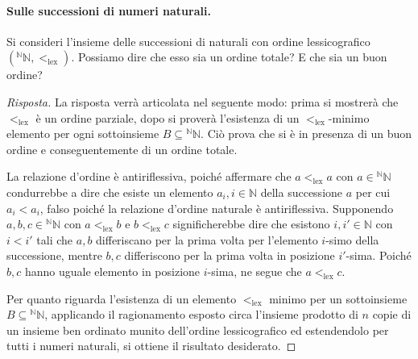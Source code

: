 \documentclass[fontsize = 11 pt, paper=A4, oneside, index=totoc, hyperref]{book}
\theoremstyle{definition}
\theoremstyle{plain}
\newcommand{\N}{\mathbb{N}}
\begin{document}
\paragraph{Sulle successioni di numeri naturali.} Si consideri l'insieme delle successioni di naturali con ordine lessicografico \(({}^\N\N, <_{\mathrm{lex}})\). Possiamo dire che esso sia un ordine totale? E che sia un buon ordine?
\begin{proof}[Risposta]
  La risposta verrà articolata nel seguente modo: prima si mostrerà che \(<_{\mathrm{lex}}\) è un ordine parziale, dopo si proverà l'esistenza di un \(<_{\mathrm{lex}}\)-minimo elemento per ogni sottoinsieme \(B \subseteq {}^\N\N\). Ciò prova che si è in presenza di un buon ordine e conseguentemente di un ordine totale.

  La relazione d'ordine è antiriflessiva, poiché affermare che \(a <_{\mathrm{lex}} a\) con \(a \in {}^\N\N\) condurrebbe a dire che esiste un elemento \(a_i, i \in \N\) della successione \(a\) per cui \(a_i < a_i\), falso poiché la relazione d'ordine naturale è antiriflessiva. Supponendo \(a,b,c \in {}^\N\N\) con \(a <_{\mathrm{lex}} b\) e \(b <_{\mathrm{lex}} c\) significherebbe dire che esistono \(i,i' \in \N\) con \(i < i'\) tali che \(a,b\) differiscano per la prima volta per l'elemento \(i\)-simo della successione, mentre \(b,c\) differiscono per la prima volta in posizione \(i'\)-sima. Poiché \(b,c\) hanno uguale elemento in posizione \(i\)-sima, ne segue che \(a <_{\mathrm{lex}} c\).

  Per quanto riguarda l'esistenza di un elemento \(<_{\mathrm{lex}}\) minimo per un sottoinsieme \(B \subseteq {}^\N\N\), applicando il ragionamento esposto circa l'insieme prodotto di \(n\) copie di un insieme ben ordinato munito dell'ordine lessicografico ed estendendolo per tutti i numeri naturali, si ottiene il risultato desiderato.
\end{proof}
\end{document}
